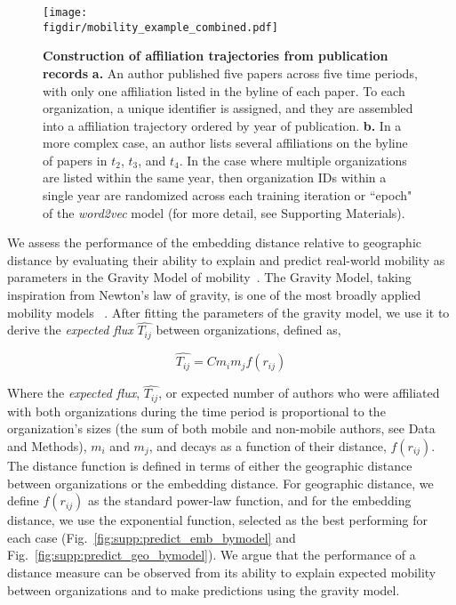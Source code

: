 \documentclass[12pt]{article} %
\def\figdir{../Figs}
\begin{document}
%
%
\begin{figure}[ht!]
    \centering
    \texttt{[image: \\figdir/mobility\_example\_combined.pdf]}
    \caption{
        \textbf{Construction of affiliation trajectories from publication records}
        \textbf{a.}
        An author published five papers across five time periods, with only one affiliation listed in the byline of each paper.
        To each organization, a unique identifier is assigned, and they are assembled into a affiliation trajectory ordered by year of publication.
        \textbf{b.}
        In a more complex case, an author lists several affiliations on the byline of papers in $t_{2}$, $t_{3}$, and $t_{4}$. 
        In the case where multiple organizations are listed within the same year, then organization IDs within a single year are randomized across each training iteration or ``epoch" of the \textit{word2vec} model (for more detail, see Supporting Materials). 
    }
    \label{fig:methods:mobility_sentence}
\end{figure}

We assess the performance of the embedding distance relative to geographic distance by evaluating their ability to explain and predict real-world mobility as parameters in the Gravity Model of mobility~\autocite{zipf1946gravity, barbosa2018human}.
The Gravity Model, taking inspiration from Newton's law of gravity, is one of the most broadly applied mobility models~\autocite{curiel2018citygravity, lewer2008immigrationgravity, jung2008highwaygravity, hong2016busgravity, truscott2012epidemicgravity, xia2005measlesgravity} . After fitting the parameters of the gravity model, we use it to derive the \textit{expected flux} $\hat{T_{ij}}$ between organizations, defined as,

\begin{equation}
	\label{eq:gravity_basic}
	\hat{T_{ij}} = Cm_{i}m_{j}f(r_{ij})
\end{equation}

Where the \textit{expected flux}, $\hat{T_{ij}}$, or expected number of authors who were affiliated with both organizations during the time period is proportional to the organization's sizes (the sum of both mobile and non-mobile authors, see Data and Methods), $m_{i}$ and $m_{j}$, and decays as a function of their distance, $f(r_{ij})$.
The distance function is defined in terms of either the geographic distance between organizations or the embedding distance. 
For geographic distance, we define $f(r_{ij})$ as the standard power-law function, and for the embedding distance, we use the exponential function, selected as the best performing for each case (Fig.~\ref{fig:supp:predict_emb_bymodel} and Fig.~\ref{fig:supp:predict_geo_bymodel}).
We argue that the performance of a distance measure can be observed from its ability to explain expected mobility between organizations and to make predictions using the gravity model.
\end{document}
